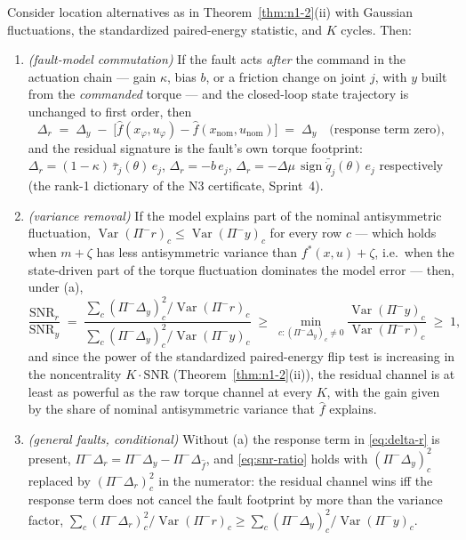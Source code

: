 \begin{proposition}
\label{prop:power-gain}
Consider location alternatives as in Theorem~\ref{thm:n1-2}(ii) with
Gaussian fluctuations, the standardized paired-energy statistic, and $K$
cycles. Then:
\begin{enumerate}
\item[(a)] \emph{(fault-model commutation)} If the fault acts \emph{after}
the command in the actuation chain --- gain $\kappa$, bias $b$, or a
friction change on joint $j$, with $y$ built from the \emph{commanded}
torque --- and the closed-loop state trajectory is unchanged to first order,
then
\begin{equation}
  \label{eq:delta-r}
  \Delta_r \;=\; \Delta_y \;-\; \bigl[\hat f(x_{\varphi},u_{\varphi}) - \hat f(x_{\mathrm{nom}},u_{\mathrm{nom}})\bigr]
  \;=\; \Delta_y \quad\text{(response term zero)},
\end{equation}
and the residual signature is the fault's own torque footprint:
$\Delta_r = (1-\kappa)\,\bar\tau_j(\theta)\,e_j$, $\Delta_r = -b\,e_j$,
$\Delta_r = -\Delta\mu\,\operatorname{sign}\bar{\dot q}_j(\theta)\,e_j$
respectively (the rank-1 dictionary of the N3 certificate, Sprint~4).
\item[(b)] \emph{(variance removal)} If the model explains part of the
nominal antisymmetric fluctuation, $\operatorname{Var}(\Pi^{-}r)_c \le
\operatorname{Var}(\Pi^{-}y)_c$ for every row $c$ --- which holds when
$m + \zeta$ has less antisymmetric variance than $f^{*}(x,u) + \zeta$, i.e.\
when the state-driven part of the torque fluctuation dominates the model
error --- then, under (a),
\begin{equation}
  \label{eq:snr-ratio}
  \frac{\mathrm{SNR}_r}{\mathrm{SNR}_y}
  \;=\;
  \frac{\sum_c (\Pi^-\Delta_y)_c^2 / \operatorname{Var}(\Pi^-r)_c}
       {\sum_c (\Pi^-\Delta_y)_c^2 / \operatorname{Var}(\Pi^-y)_c}
  \;\ge\; \min_{c : (\Pi^-\Delta_y)_c \neq 0} \frac{\operatorname{Var}(\Pi^-y)_c}{\operatorname{Var}(\Pi^-r)_c}
  \;\ge\; 1 ,
\end{equation}
and since the power of the standardized paired-energy flip test is
increasing in the noncentrality $K \cdot \mathrm{SNR}$
(Theorem~\ref{thm:n1-2}(ii)), the residual channel is at least as powerful
as the raw torque channel at every $K$, with the gain given by the share of
nominal antisymmetric variance that $\hat f$ explains.
\item[(c)] \emph{(general faults, conditional)} Without (a) the response term
in \eqref{eq:delta-r} is present, $\Pi^-\Delta_r = \Pi^-\Delta_y -
\Pi^-\Delta_{\hat f}$, and \eqref{eq:snr-ratio} holds with
$(\Pi^-\Delta_y)_c^2$ replaced by $(\Pi^-\Delta_r)_c^2$ in the numerator: the
residual channel wins iff the response term does not cancel the fault
footprint by more than the variance factor,
$\sum_c (\Pi^-\Delta_r)_c^2/\operatorname{Var}(\Pi^-r)_c \ge
\sum_c (\Pi^-\Delta_y)_c^2/\operatorname{Var}(\Pi^-y)_c$.
\end{enumerate}
\end{proposition}

